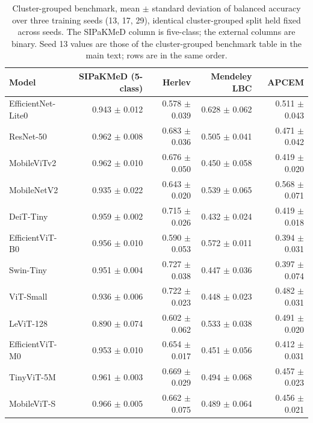 \documentclass[12pt,letterpaper]{article}
\begin{document}
\begin{table}[htbp]
\centering
\caption{Cluster-grouped benchmark, mean $\pm$ standard deviation of balanced accuracy over three training seeds (13, 17, 29), identical cluster-grouped split held fixed across seeds. The SIPaKMeD column is five-class; the external columns are binary. Seed 13 values are those of the cluster-grouped benchmark table in the main text; rows are in the same order.}
\label{tab:cluster-seeds}
\footnotesize
\begin{tabular}{lrrrr}
\toprule
Model & SIPaKMeD (5-class) & Herlev & Mendeley LBC & APCEM \\
\midrule
EfficientNet-Lite0 & 0.943 $\pm$ 0.012 & 0.578 $\pm$ 0.039 & 0.628 $\pm$ 0.062 & 0.511 $\pm$ 0.043 \\
ResNet-50 & 0.962 $\pm$ 0.008 & 0.683 $\pm$ 0.036 & 0.505 $\pm$ 0.041 & 0.471 $\pm$ 0.042 \\
MobileViTv2 & 0.962 $\pm$ 0.010 & 0.676 $\pm$ 0.050 & 0.450 $\pm$ 0.058 & 0.419 $\pm$ 0.020 \\
MobileNetV2 & 0.935 $\pm$ 0.022 & 0.643 $\pm$ 0.020 & 0.539 $\pm$ 0.065 & 0.568 $\pm$ 0.071 \\
DeiT-Tiny & 0.959 $\pm$ 0.002 & 0.715 $\pm$ 0.026 & 0.432 $\pm$ 0.024 & 0.419 $\pm$ 0.018 \\
EfficientViT-B0 & 0.956 $\pm$ 0.010 & 0.590 $\pm$ 0.053 & 0.572 $\pm$ 0.011 & 0.394 $\pm$ 0.031 \\
Swin-Tiny & 0.951 $\pm$ 0.004 & 0.727 $\pm$ 0.038 & 0.447 $\pm$ 0.036 & 0.397 $\pm$ 0.074 \\
ViT-Small & 0.936 $\pm$ 0.006 & 0.722 $\pm$ 0.023 & 0.448 $\pm$ 0.023 & 0.482 $\pm$ 0.031 \\
LeViT-128 & 0.890 $\pm$ 0.074 & 0.602 $\pm$ 0.062 & 0.533 $\pm$ 0.038 & 0.491 $\pm$ 0.020 \\
EfficientViT-M0 & 0.953 $\pm$ 0.010 & 0.654 $\pm$ 0.017 & 0.451 $\pm$ 0.056 & 0.412 $\pm$ 0.031 \\
TinyViT-5M & 0.961 $\pm$ 0.003 & 0.669 $\pm$ 0.029 & 0.494 $\pm$ 0.068 & 0.457 $\pm$ 0.023 \\
MobileViT-S & 0.966 $\pm$ 0.005 & 0.662 $\pm$ 0.075 & 0.489 $\pm$ 0.064 & 0.456 $\pm$ 0.021 \\
\bottomrule
\end{tabular}
\end{table}
\end{document}
